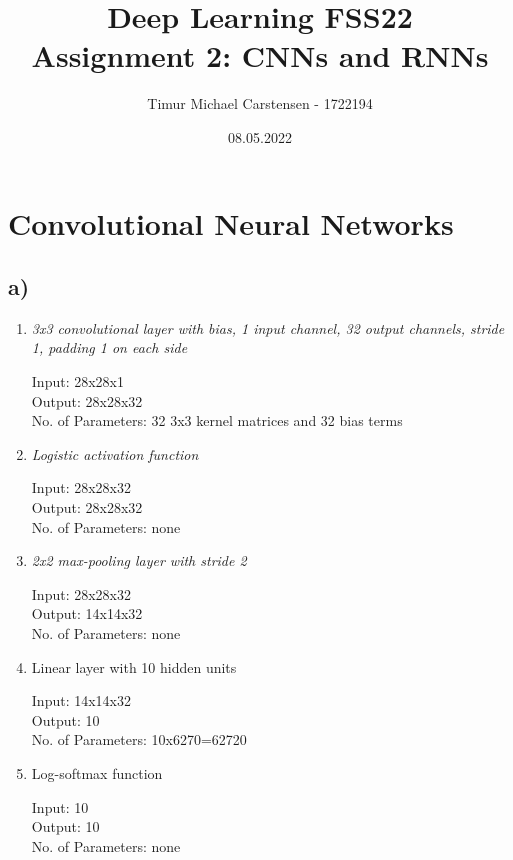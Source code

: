 \documentclass[11pt]{article}
\title{Deep Learning FSS22 \\ Assignment 2: CNNs and RNNs}
\author{Timur Michael Carstensen - 1722194}
\date{08.05.2022}
\begin{document}

\maketitle


\newpage

\tableofcontents

\newpage



\section{Convolutional Neural Networks}\label{sec:cnn}

\subsection{a)}\label{subsec:cnn-a}
\begin{enumerate}[label=(\roman*)]
\item \textit{3x3 convolutional layer with bias, 1 input channel, 32 output channels, stride 1, padding 1 on each side} 

Input: 28x28x1\\
Output: 28x28x32\\
No. of Parameters: 32 3x3 kernel matrices and 32 bias terms \\

\item \textit{Logistic activation function}

Input: 28x28x32 \\
Output: 28x28x32 \\
No. of Parameters: none\\

\item \textit{2x2 max-pooling layer with stride 2}

Input: 28x28x32\\
Output: 14x14x32\\
No. of Parameters: none \\

\item Linear layer with 10 hidden units

Input: 14x14x32\\
Output: 10 \\
No. of Parameters: 10x6270=62720 \\

\item Log-softmax function

Input: 10 \\
Output: 10 \\
No. of Parameters: none \\
\end{enumerate}
\end{document}
